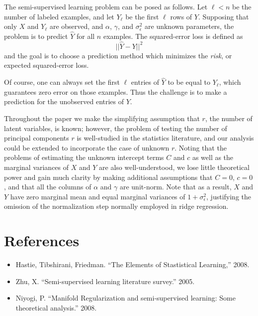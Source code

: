 \documentclass[11pt]{article}
\begin{document}
The semi-supervised learning problem can be posed as follows.  Let
$\ell < n$ be the number of labeled examples, and let $Y_\ell$ be the
first $\ell$ rows of $Y$.  Supposing that only $X$ and $Y_\ell$ are
observed, and $\alpha$, $\gamma$, and $\sigma^2_\epsilon$ are unknown
parameters, the problem is to predict $\hat{Y}$ for all $n$ examples.
The squared-error loss is defined as
\[
||\hat{Y} - Y||^2
\]
and the goal is to choose a prediction method which minimizes the
\emph{risk}, or expected squared-error loss.

Of course, one can always set the first $\ell$ entries of $\hat{Y}$ to be
equal to $Y_\ell$, which guarantees zero error on those examples.  Thus the
challenge is to make a prediction for the unobserved entries of $Y$.

Throughout the paper we make the simplifying assumption that $r$, the
number of latent variables, is known; however, the problem of testing
the number of principal components $r$ is well-studied in the
statistics literature, and our analysis could be extended to
incorporate the case of unknown $r$.  Noting that the problems of
estimating the unknown intercept terms $C$ and $c$ as well as the
marginal variances of $X$ and $Y$ are also well-understood, we lose
little theoretical power and gain much clarity by making additional
assumptions that $C=0$, $c=0$, and that all the columns of $\alpha$
and $\gamma$ are unit-norm.  Note that as a result, $X$ and $Y$ have
zero marginal mean and equal marginal variances of $1 +
\sigma_\epsilon^2$, justifying the omission of the normalization step
normally employed in ridge regression.

\section{References}

\begin{itemize}
\item Hastie, Tibshirani, Friedman.  ``The Elements of Stastistical Learning,'' 2008.
\item Zhu, X.  ``Semi-supervised learning literature survey.'' 2005.
\item Niyogi, P.  ``Manifold Regularization and semi-supervised learning:
Some theoretical analysis.''  2008.
\end{itemize}
\end{document}
